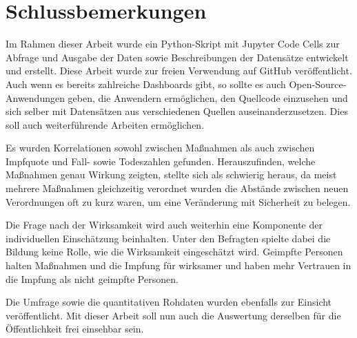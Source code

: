 \chapter{Schlussbemerkungen}
\label{cha:Schluss}

Im Rahmen dieser Arbeit wurde ein Python-Skript mit Jupyter Code Cells zur Abfrage und Ausgabe der Daten sowie Beschreibungen der Datensätze entwickelt und erstellt. Diese Arbeit wurde zur freien Verwendung auf GitHub veröffentlicht. Auch wenn es bereits zahlreiche Dashboards gibt, so sollte es auch Open-Source-Anwendungen geben, die Anwendern ermöglichen, den Quellcode einzusehen und sich selber mit Datensätzen aus verschiedenen Quellen auseinanderzusetzen.
Dies soll auch weiterführende Arbeiten ermöglichen.

Es wurden Korrelationen sowohl zwischen Maßnahmen als auch zwischen Impfquote und Fall- sowie Todeszahlen gefunden. Herauszufinden, welche Maßnahmen genau Wirkung zeigten, stellte sich als schwierig heraus, da meist mehrere Maßnahmen gleichzeitig verordnet wurden die Abstände zwischen neuen Verordnungen oft zu kurz waren, um eine Veränderung mit Sicherheit zu belegen.

Die Frage nach der Wirksamkeit wird auch weiterhin eine Komponente der individuellen Einschätzung beinhalten. Unter den Befragten spielte dabei die Bildung keine Rolle, wie die Wirksamkeit eingeschätzt wird. Geimpfte Personen halten Maßnahmen und die Impfung für wirksamer und haben mehr Vertrauen in die Impfung als nicht geimpfte Personen.

Die Umfrage sowie die quantitativen Rohdaten wurden ebenfalls zur Einsicht veröffentlicht. Mit dieser Arbeit soll nun auch die Auswertung derselben für die Öffentlichkeit frei einsehbar sein.
